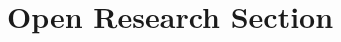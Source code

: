 \documentclass[draft]{agujournal2019}
\begin{document}
%








%
%

\section*{Open Research Section}
\end{document}
